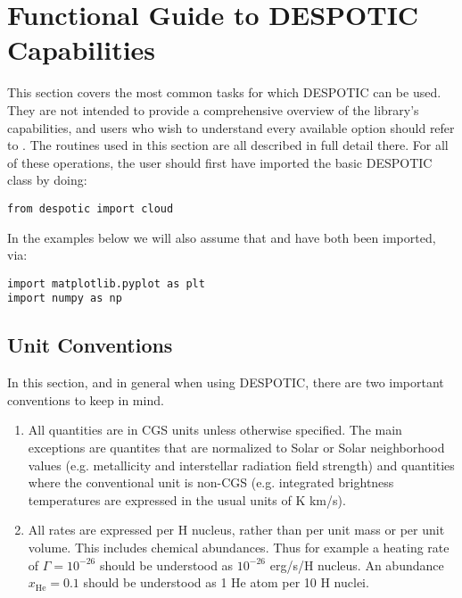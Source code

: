 \documentclass[letterpaper,10pt,english]{sphinxmanual}
\begin{document}
\chapter{Functional Guide to DESPOTIC Capabilities}
\label{functions:functional-guide-to-despotic-capabilities}\label{functions::doc}
This section covers the most common tasks for which DESPOTIC can be
used. They are not intended to provide a comprehensive overview of the
library's capabilities, and users who wish to understand every
available option should refer to {\hyperref[fulldoc:sec-fulldoc]{\emph{}}}. The routines used in
this section are all described in full detail there. For all of these
operations, the user should first have imported the basic DESPOTIC
class  by doing:

\begin{Verbatim}[commandchars=\\\{\}]
from despotic import cloud
\end{Verbatim}

In the examples below we will also assume that  and
 have both been imported, via:

\begin{Verbatim}[commandchars=\\\{\}]
import matplotlib.pyplot as plt
import numpy as np
\end{Verbatim}


\section{Unit Conventions}
\label{functions:unit-conventions}
In this section, and in general when using DESPOTIC, there are two
important conventions to keep in mind.
\begin{enumerate}
\item {} 
All quantities are in CGS units unless otherwise specified. The
main exceptions are quantites that are normalized to Solar or Solar
neighborhood values (e.g. metallicity and interstellar radiation
field strength) and quantities where the conventional unit is
non-CGS (e.g. integrated brightness temperatures are expressed in
the usual units of K km/s).

\item {} 
All rates are expressed per H nucleus, rather than per unit mass or
per unit volume. This includes chemical abundances. Thus for
example a heating rate of \(\Gamma=10^{-26}\) should be
understood as \(10^{-26}\) erg/s/H nucleus. An abundance
\(x_{\mathrm{He}}=0.1\) should be understood as 1 He atom per
10 H nuclei.

\end{enumerate}
\end{document}
